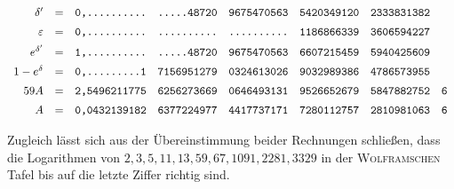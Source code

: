 \[\begin{array}{rcrlllll}
\delta'&=&\text{\ttfamily 0,..........}&\text{\ttfamily .....48720}&\text{\ttfamily 9675470563}&\text{\ttfamily 5420349120}&\text{\ttfamily 2333831382}&\\[5pt]
\varepsilon&=&\text{\ttfamily 0,..........}&\text{\ttfamily ..........}&\text{\ttfamily ..........}&\text{\ttfamily 1186866339}&\text{\ttfamily 3606594227}&\\[5pt]
e^{\delta'}&=&\text{\ttfamily 1,..........}&\text{\ttfamily .....48720}&\text{\ttfamily 9675470563}&\text{\ttfamily 6607215459}&\text{\ttfamily 5940425609}&\\[5pt]
1-e^\delta&=&\text{\ttfamily 0,.........1}&\text{\ttfamily 7156951279}&\text{\ttfamily 0324613026}&\text{\ttfamily 9032989386}&\text{\ttfamily 4786573955}&\\[5pt]
59A&=&\text{\ttfamily 2,5496211775}&\text{\ttfamily 6256273669}&\text{\ttfamily 0646493131}&\text{\ttfamily 9526652679}&\text{\ttfamily 5847882752}&\text{\ttfamily 6}\\[5pt]
A&=&\text{\ttfamily 0,0432139182}&\text{\ttfamily 6377224977}&\text{\ttfamily 4417737171}&\text{\ttfamily 7280112757}&\text{\ttfamily 2810981063}&\text{\ttfamily 6}
\end{array}
\]\endgroup


Zugleich lässt sich aus der Übereinstimmung beider Rechnungen schließen,
dass die Logarithmen von $2,3,5,11,13,59,67,1091,2281,3329$ in der
\textsc{Wolframschen} Tafel bis auf die letzte Ziffer richtig sind.

\clearpage
\endgroup
